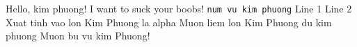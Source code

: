 Hello, kim phuong! I want to suck your boobs!
\texttt{num vu kim phuong}
Line 1
Line 2
Xuat tinh vao lon Kim Phuong
\alpha la alpha \beta Muon liem lon Kim Phuong
\alpha du kim phuong
Muon bu vu kim Phuong!
